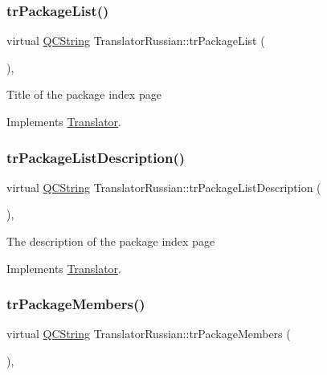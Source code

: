 \subsubsection{\texorpdfstring{trPackageList()}{trPackageList()}}
{\footnotesize\ttfamily virtual \mbox{\hyperlink{class_q_c_string}{Q\+C\+String}} Translator\+Russian\+::tr\+Package\+List (\begin{DoxyParamCaption}{ }\end{DoxyParamCaption})\hspace{0.3cm}{\ttfamily [inline]}, {\ttfamily [virtual]}}

Title of the package index page 

Implements \mbox{\hyperlink{class_translator}{Translator}}.

\mbox{\label{class_translator_russian_a73855a3e8375e88eaf2769645a109685}} 
\subsubsection{\texorpdfstring{trPackageListDescription()}{trPackageListDescription()}}
{\footnotesize\ttfamily virtual \mbox{\hyperlink{class_q_c_string}{Q\+C\+String}} Translator\+Russian\+::tr\+Package\+List\+Description (\begin{DoxyParamCaption}{ }\end{DoxyParamCaption})\hspace{0.3cm}{\ttfamily [inline]}, {\ttfamily [virtual]}}

The description of the package index page 

Implements \mbox{\hyperlink{class_translator}{Translator}}.

\mbox{\label{class_translator_russian_a695c1570510e7aaf34ecc144aafa531c}} 
\subsubsection{\texorpdfstring{trPackageMembers()}{trPackageMembers()}}
{\footnotesize\ttfamily virtual \mbox{\hyperlink{class_q_c_string}{Q\+C\+String}} Translator\+Russian\+::tr\+Package\+Members (\begin{DoxyParamCaption}{ }\end{DoxyParamCaption})\hspace{0.3cm}{\ttfamily [inline]}, {\ttfamily [virtual]}}

